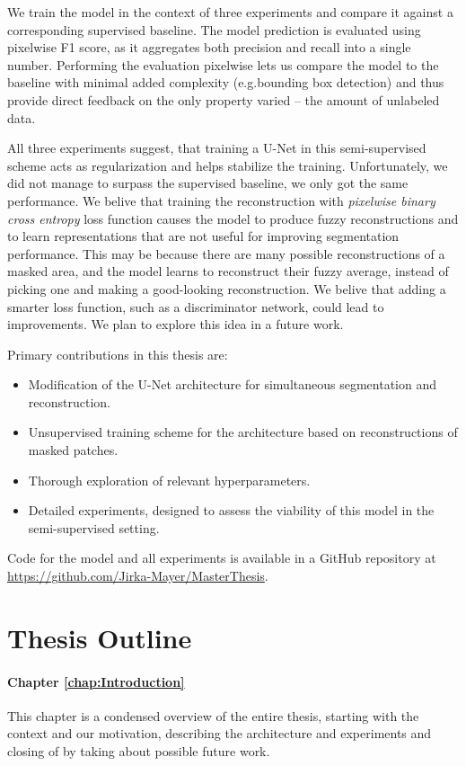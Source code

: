 We train the model in the context of three experiments and compare it against a corresponding supervised baseline. The model prediction is evaluated using pixelwise F1 score, as it aggregates both precision and recall into a single number. Performing the evaluation pixelwise lets us compare the model to the baseline with minimal added complexity (e.g.\@ bounding box detection) and thus provide direct feedback on the only property varied -- the amount of unlabeled data.

All three experiments suggest, that training a U-Net in this semi-supervised scheme acts as regularization and helps stabilize the training. Unfortunately, we did not manage to surpass the supervised baseline, we only got the same performance. We belive that training the reconstruction with \emph{pixelwise binary cross entropy} loss function causes the model to produce fuzzy reconstructions and to learn representations that are not useful for improving segmentation performance. This may be because there are many possible reconstructions of a masked area, and the model learns to reconstruct their fuzzy average, instead of picking one and making a good-looking reconstruction. We belive that adding a smarter loss function, such as a discriminator network, could lead to improvements. We plan to explore this idea in a future work.

Primary contributions in this thesis are:

\begin{itemize}
    \item Modification of the U-Net architecture for simultaneous segmentation and reconstruction.
    \item Unsupervised training scheme for the architecture based on reconstructions of masked patches.
    \item Thorough exploration of relevant hyperparameters.
    \item Detailed experiments, designed to assess the viability of this model in the semi-supervised setting.
\end{itemize}

Code for the model and all experiments is available in a GitHub repository at \url{https://github.com/Jirka-Mayer/MasterThesis}.


\section{Thesis Outline}

\paragraph*{Chapter \ref{chap:Introduction}} This chapter is a condensed overview of the entire thesis, starting with the context and our motivation, describing the architecture and experiments and closing of by taking about possible future work.

